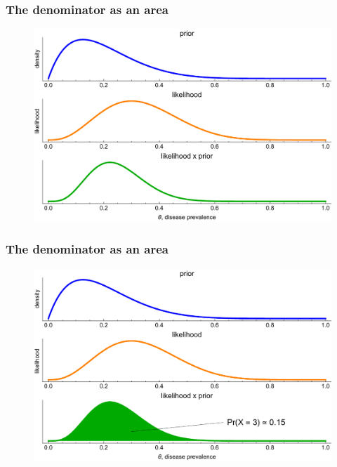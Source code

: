 \documentclass[handout]{beamer}
\begin{document}
\begin{frame}
	\frametitle{The denominator as an area}
	
	\begin{figure}
		\centerline{\includegraphics[width=1\textwidth]{animations_figures/binomial_area_1.pdf}}
	\end{figure}
	
\end{frame}

\begin{frame}
	\frametitle{The denominator as an area}
	
	\begin{figure}
		\centerline{\includegraphics[width=1\textwidth]{animations_figures/binomial_area_2.pdf}}
	\end{figure}
	
\end{frame}
\end{document}
